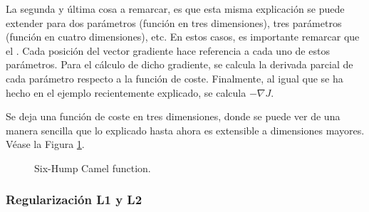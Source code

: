 La segunda y última cosa a remarcar, es que esta misma explicación se puede extender para dos parámetros (función en tres dimensiones), tres parámetros (función en cuatro dimensiones), etc. En estos casos, es importante remarcar que el . Cada posición del vector gradiente hace referencia a cada uno de estos parámetros. Para el cálculo de dicho gradiente, se calcula la derivada parcial de cada  parámetro respecto a la función de coste. Finalmente, al igual que se ha hecho en el ejemplo recientemente explicado, se calcula $- \nabla J$. 

Se deja una función de coste en tres dimensiones, donde se puede ver de una manera sencilla que lo explicado hasta ahora es extensible a dimensiones mayores. Véase la Figura \ref{humpCamel}.
\begin{figure}[H]
    \centering
    \caption{Six-Hump Camel function.}
    \label{humpCamel}
\end{figure}


\subsubsection{Regularización L1 y L2}
\label{ap:L1L2sec}

